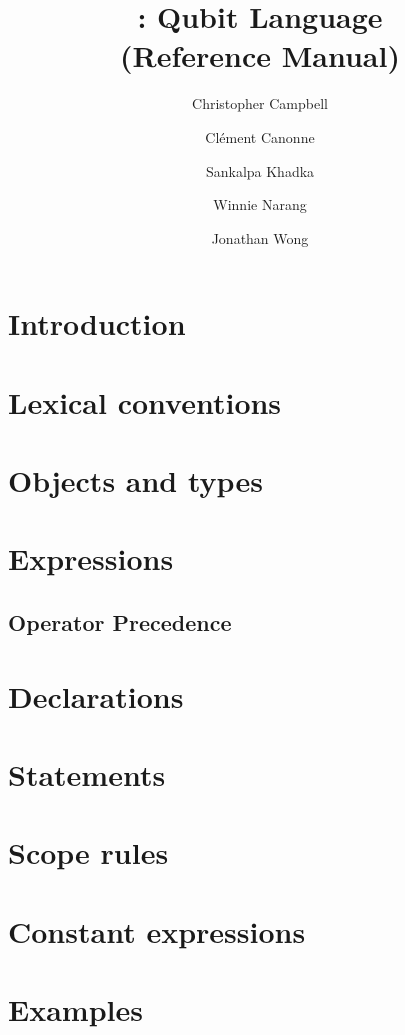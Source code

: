 \documentclass[11pt]{article}
\title{\QL: Qubit Language\\ \Large(Reference Manual)}
\author{
  Christopher Campbell
  \and Cl\'ement Canonne
  \and Sankalpa Khadka
  \and Winnie Narang
  \and Jonathan Wong
}
\begin{document}
\maketitle
\tableofcontents
\clearpage

\section{Introduction}
\section{Lexical conventions}


\section{Objects and types}

\section{Expressions}
\subsection{Operator Precedence}

\section{Declarations}

\section{Statements}

\section{Scope rules}

\section{Constant expressions}

\section{Examples}

\end{document}
